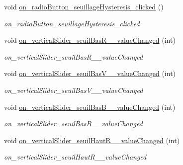 \begin{DoxyCompactItemize}
void \hyperlink{classMainWindow_a86a77b82762aa811b0a89cc8be7ce59e}{on\+\_\+radio\+Button\+\_\+seuillage\+Hysteresis\+\_\+clicked} ()
\begin{DoxyCompactList}\small\item\em on\+\_\+radio\+Button\+\_\+seuillage\+Hysteresis\+\_\+clicked \end{DoxyCompactList}\item 
\mbox{\label{classMainWindow_a8d42f39e072db3ba34dbd693fb3e03b1}} 
void \hyperlink{classMainWindow_a8d42f39e072db3ba34dbd693fb3e03b1}{on\+\_\+vertical\+Slider\+\_\+seuil\+Bas\+R\+\_\+\_\+value\+Changed} (int)
\begin{DoxyCompactList}\small\item\em on\+\_\+vertical\+Slider\+\_\+seuil\+Bas\+R\+\_\+\_\+value\+Changed \end{DoxyCompactList}\item 
\mbox{\label{classMainWindow_aff55460fade4cfec35d634a75e53f2b0}} 
void \hyperlink{classMainWindow_aff55460fade4cfec35d634a75e53f2b0}{on\+\_\+vertical\+Slider\+\_\+seuil\+Bas\+V\+\_\+\_\+value\+Changed} (int)
\begin{DoxyCompactList}\small\item\em on\+\_\+vertical\+Slider\+\_\+seuil\+Bas\+V\+\_\+\_\+value\+Changed \end{DoxyCompactList}\item 
\mbox{\label{classMainWindow_a4da5b6fd53c17717eb29e287a0d3b49d}} 
void \hyperlink{classMainWindow_a4da5b6fd53c17717eb29e287a0d3b49d}{on\+\_\+vertical\+Slider\+\_\+seuil\+Bas\+B\+\_\+\_\+value\+Changed} (int)
\begin{DoxyCompactList}\small\item\em on\+\_\+vertical\+Slider\+\_\+seuil\+Bas\+B\+\_\+\_\+value\+Changed \end{DoxyCompactList}\item 
\mbox{\label{classMainWindow_adb86796f8b99a463f50b10cd98d44676}} 
void \hyperlink{classMainWindow_adb86796f8b99a463f50b10cd98d44676}{on\+\_\+vertical\+Slider\+\_\+seuil\+Haut\+R\+\_\+\_\+value\+Changed} (int)
\begin{DoxyCompactList}\small\item\em on\+\_\+vertical\+Slider\+\_\+seuil\+Haut\+R\+\_\+\_\+value\+Changed \end{DoxyCompactList}\item 

\end{DoxyCompactItemize}
